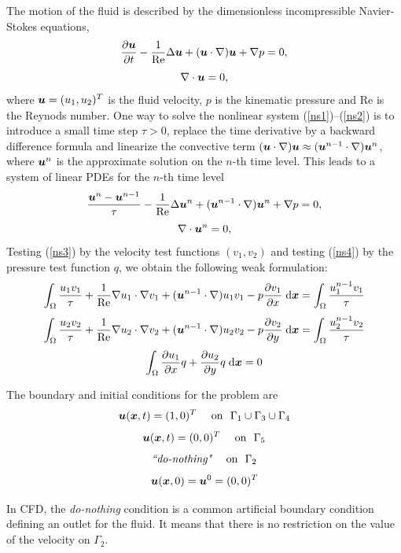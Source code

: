 \documentclass[11pt]{article}
\newcommand{\bfu}{\mbox{\boldmath $u$}}
\newcommand{\bfx}{\mbox{\boldmath $x$}}
\newcommand{\dd}[2]{\frac{\partial #1}{\partial #2}}
\newcommand{\dx}{\;\mbox{d}\bfx}
\begin{document}
The motion of the fluid is described by the dimensionless incompressible
Navier-Stokes equations,
\begin{equation} \label{ns1}
  \dd{\bfu}{t} - \frac{1}{\rm Re} \Delta \bfu + (\bfu \cdot \nabla) \bfu + \nabla p  = 0,
\end{equation}
\begin{equation} \label{ns2}
  \nabla \cdot \bfu = 0,
\end{equation}
where $\bfu = (u_1, u_2)^T$ is the fluid velocity, $p$ is the kinematic pressure and Re
is the Reynods number. One way to solve the nonlinear system (\ref{ns1})--(\ref{ns2}) is to
introduce a small time step $\tau > 0$, replace the time derivative by a backward
difference formula and linearize the convective term
$(\bfu \cdot \nabla) \bfu \approx (\bfu^{n-1} \cdot \nabla) \bfu^n$, where $\bfu^n$ is the
approximate solution on the $n$-th time level. This leads to a system of linear PDEs for the
$n$-th time level
\begin{equation} \label{ns3}
  \frac{\bfu^n - \bfu^{n-1}}{\tau} - \frac{1}{\rm Re} \Delta \bfu^n +
    (\bfu^{n-1} \cdot \nabla) \bfu^n + \nabla p  = 0,
\end{equation}
\begin{equation} \label{ns4}
  \nabla \cdot \bfu^n = 0,
\end{equation}
Testing (\ref{ns3}) by the velocity test functions $(v_1, v_2)$ and testing (\ref{ns4})
by the pressure test function $q$, we obtain the following weak formulation:
$$\int_\Omega \frac{u_1 v_1}{\tau} +
  \frac{1}{\rm Re} \nabla u_1 \cdot \nabla v_1 +
  (\bfu^{n-1} \cdot \nabla) u_1 v_1 - p \dd{v_1}{x} \dx
  = \int_\Omega \frac{u^{n-1}_1 v_1}{\tau} $$
$$\int_\Omega \frac{u_2 v_2}{\tau} +
  \frac{1}{\rm Re} \nabla u_2 \cdot \nabla v_2 +
  (\bfu^{n-1} \cdot \nabla) u_2 v_2 - p \dd{v_2}{y} \dx
  = \int_\Omega \frac{u^{n-1}_2 v_2}{\tau} $$
$$\int_\Omega \dd{u_1}{x} q + \dd{u_2}{y} q \dx = 0 $$

The boundary and initial conditions  for the problem are
$$\bfu(\bfx, t) = (1, 0)^T \ \ \ \ \mbox{on}\ \ \Gamma_1 \cup \Gamma_3 \cup \Gamma_4$$
$$\bfu(\bfx, t) = (0, 0)^T \ \ \ \ \mbox{on}\ \ \Gamma_5$$
$$\mbox{\it ``do-nothing"}\ \ \ \ \mbox{on}\ \ \Gamma_2$$
\begin{equation} \bfu(\bfx, 0) = \bfu^0 = (0, 0)^T \label{ns:initial} \end{equation}

In CFD, the {\it do-nothing} condition is a common artificial boundary condition defining
an outlet for the fluid. It means that there is no restriction on the value
of the velocity on $\Gamma_2$.
\end{document}
